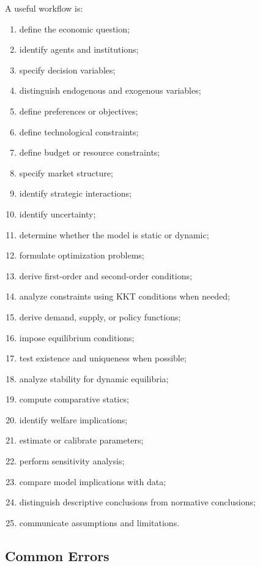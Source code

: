 A useful workflow is:

\begin{enumerate}
    \item define the economic question;
    \item identify agents and institutions;
    \item specify decision variables;
    \item distinguish endogenous and exogenous variables;
    \item define preferences or objectives;
    \item define technological constraints;
    \item define budget or resource constraints;
    \item specify market structure;
    \item identify strategic interactions;
    \item identify uncertainty;
    \item determine whether the model is static or dynamic;
    \item formulate optimization problems;
    \item derive first-order and second-order conditions;
    \item analyze constraints using KKT conditions when needed;
    \item derive demand, supply, or policy functions;
    \item impose equilibrium conditions;
    \item test existence and uniqueness when possible;
    \item analyze stability for dynamic equilibria;
    \item compute comparative statics;
    \item identify welfare implications;
    \item estimate or calibrate parameters;
    \item perform sensitivity analysis;
    \item compare model implications with data;
    \item distinguish descriptive conclusions from normative conclusions;
    \item communicate assumptions and limitations.
\end{enumerate}

\subsection{Common Errors}
\label{subsec:mathematical-economics-common-errors}

